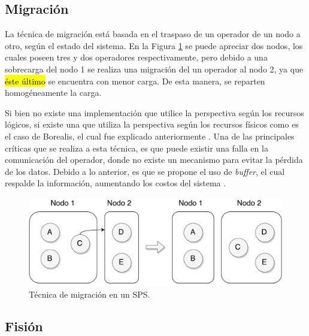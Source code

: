\subsection{Migración}
\label{sec:migracionBC}

La técnica de migración está basada en el traspaso de un operador de un nodo a otro, según el estado del sistema. En la Figura \ref{fig:migracion} se puede apreciar dos nodos, los cuales poseen tres y dos operadores respectivamente, pero debido a una sobrecarga del nodo 1 se realiza una migración del un operador al nodo 2, ya que \hl{éste último} se encuentra con menor carga. De esta manera, se reparten homogéneamente la carga.

Si bien no existe una implementación que utilice la perspectiva según los recursos lógicos, si existe una que utiliza la perspectiva según los recursos físicos como es el caso de Borealis, el cual fue explicado anteriormente \citep{XingZH05}. Una de las principales críticas que se realiza a esta técnica, es que puede existir una falla en la comunicación del operador, donde no existe un mecanismo para evitar la pérdida de los datos. Debido a lo anterior, es que se propone el uso de \textit{buffer}, el cual respalde la información, aumentando los costos del sistema \citep{PittauACA07}.

\begin{figure}[!ht]
	\centering
	\includegraphics[scale=0.45]{images/Migracion.pdf}
	\caption{Técnica de migración en un SPS.}
	\label{fig:migracion}
\end{figure}

\subsection{Fisión}
\label{sec:fisionBC}

